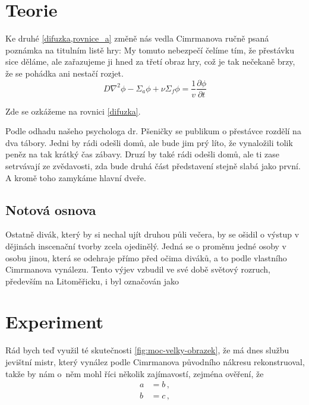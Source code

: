 \documentclass{cygclanek}
\begin{document}
\section{Teorie}
Ke druhé \cref{difuzka,rovnice_a} změně nás vedla Cimrmanova ručně psaná poznámka na titulním listě hry:
 My tomuto nebezpečí čelíme tím, že
přestávku sice děláme, ale zařazujeme ji hned za třetí obraz hry, což je tak
nečekaně brzy, že se pohádka ani nestačí rozjet. 
\begin{equation}
  D\nabla^2\phi - \Sigma_a\phi + \nu\Sigma_f\phi = \frac{1}{v}\frac{\partial
  \phi}{\partial t}
  \label{difuzka}
\end{equation}

Zde se ozkážeme na rovnici \eqref{difuzka}. 

Podle odhadu našeho psychologa
dr. Pšeničky se publikum o přestávce rozdělí na dva tábory. Jedni by rádi
odešli domů, ale bude jim prý líto, že vynaložili tolik peněz na tak krátký čas
zábavy. Druzí by také rádi odešli domů, ale ti zase setrvávají ze zvědavosti,
zda bude druhá část představení stejně slabá jako první. A kromě toho zamykáme
hlavní dveře.


\subsection{Notová osnova}
Ostatně divák, který by si nechal ujít druhou půli večera, by se ošidil o
výstup v dějinách inscenační tvorby zcela ojedinělý. Jedná se o proměnu jedné
osoby v osobu jinou, která se odehraje přímo před očima diváků, a to podle
vlastního Cimrmanova vynálezu. Tento výjev vzbudil ve své době světový rozruch,
především na Litoměřicku, i byl označován jako 


\section{Experiment}
Rád bych teď využil té skutečnosti \ref{fig:moc-velky-obrazek}, že má dnes
službu jevištní mistr, který vynález podle Cimrmanova původního nákresu
rekonstruoval, takže by nám o~něm mohl říci několik zajímavostí, zejména
ověření, že 
\begin{align}
  a &= b \label{rovnice_a} \,,\\
  b &= c \label{rovnice_b} \,,
\end{align}
\end{document}
